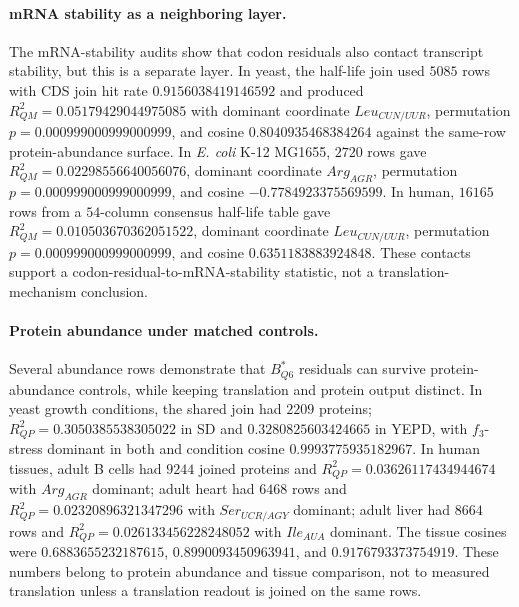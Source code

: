 \paragraph{mRNA stability as a neighboring layer.}
The mRNA-stability audits show that codon residuals also contact transcript stability, but this is a separate layer. In yeast, the half-life join used $5085$ rows with CDS join hit rate $0.9156038419146592$ and produced $R^2_{QM}=0.05179429044975085$ with dominant coordinate $Leu_{CUN/UUR}$, permutation $p=0.000999000999000999$, and cosine $0.8040935468384264$ against the same-row protein-abundance surface. In \textit{E. coli} K-12 MG1655, $2720$ rows gave $R^2_{QM}=0.02298556640056076$, dominant coordinate $Arg_{AGR}$, permutation $p=0.000999000999000999$, and cosine $-0.7784923375569599$. In human, $16165$ rows from a $54$-column consensus half-life table gave $R^2_{QM}=0.010503670362051522$, dominant coordinate $Leu_{CUN/UUR}$, permutation $p=0.000999000999000999$, and cosine $0.6351183883924848$. These contacts support a codon-residual-to-mRNA-stability statistic, not a translation-mechanism conclusion.

\paragraph{Protein abundance under matched controls.}
Several abundance rows demonstrate that $B^{*}_{Q6}$ residuals can survive protein-abundance controls, while keeping translation and protein output distinct. In yeast growth conditions, the shared join had $2209$ proteins; $R^2_{QP}=0.3050385538305022$ in SD and $0.3280825603424665$ in YEPD, with $f_3$-stress dominant in both and condition cosine $0.9993775935182967$. In human tissues, adult B cells had $9244$ joined proteins and $R^2_{QP}=0.03626117434944674$ with $Arg_{AGR}$ dominant; adult heart had $6468$ rows and $R^2_{QP}=0.02320896321347296$ with $Ser_{UCR/AGY}$ dominant; adult liver had $8664$ rows and $R^2_{QP}=0.026133456228248052$ with $Ile_{AUA}$ dominant. The tissue cosines were $0.6883655232187615$, $0.8990093450963941$, and $0.9176793373754919$. These numbers belong to protein abundance and tissue comparison, not to measured translation unless a translation readout is joined on the same rows.

